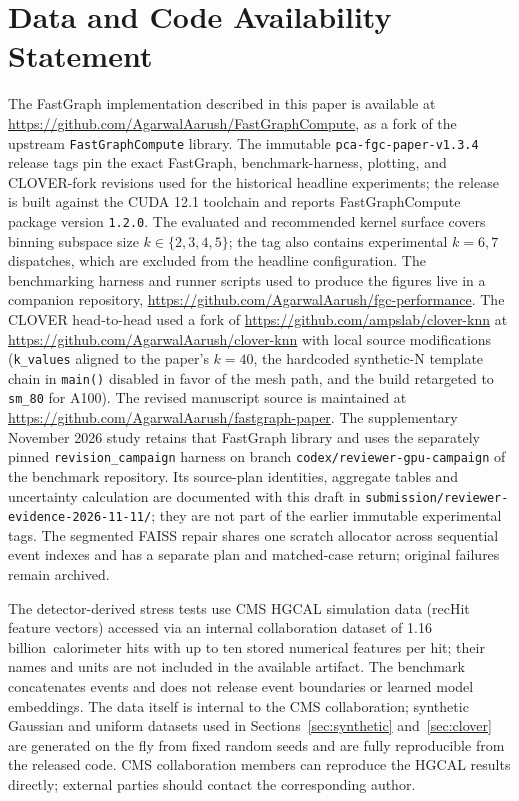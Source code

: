 \documentclass[final,3p,11pt]{elsarticle}
\newcommand{\hgcalRecHits}{1.16\,billion}
\begin{document}
\section{Data and Code Availability Statement}
\begingroup
\sloppy
The FastGraph implementation described in this paper is available at
\url{https://github.com/AgarwalAarush/FastGraphCompute}, as a fork of
the upstream \texttt{FastGraphCompute} library.
The immutable \texttt{pca-fgc-paper-v1.3.4} release tags pin the exact
FastGraph, benchmark-harness, plotting, and CLOVER-fork revisions used
for the historical headline experiments; the release is built against the CUDA
12.1 toolchain and reports FastGraphCompute package version \texttt{1.2.0}.
The evaluated and recommended kernel surface covers binning subspace size
$k \in \{2, 3, 4, 5\}$; the tag also contains experimental $k=6,7$
dispatches, which are excluded from the headline configuration. The benchmarking harness and runner scripts
used to produce the figures live in a companion repository,
\url{https://github.com/AgarwalAarush/fgc-performance}. The CLOVER
head-to-head used a fork of
\url{https://github.com/ampslab/clover-knn} at
\url{https://github.com/AgarwalAarush/clover-knn} with local source
modifications (\texttt{k\_values} aligned to the paper's $k{=}40$, the
hardcoded synthetic-N template chain in \texttt{main()} disabled in favor
of the mesh path, and the build retargeted to \texttt{sm\_80} for A100).
The revised manuscript source is maintained at
\url{https://github.com/AgarwalAarush/fastgraph-paper}.
The supplementary November 2026 study retains that FastGraph library and
uses the separately pinned \texttt{revision\_campaign} harness on branch
\texttt{codex/reviewer-gpu-campaign} of the benchmark repository.
Its source-plan identities, aggregate tables and uncertainty calculation
are documented with this draft in
\texttt{submission/reviewer-evidence-2026-11-11/}; they are not part of
the earlier immutable experimental tags. The segmented FAISS repair
shares one scratch allocator across sequential event indexes and has a
separate plan and matched-case return; original failures remain archived.
\endgroup

The detector-derived stress tests use CMS HGCAL simulation data (recHit
feature vectors) accessed via an internal collaboration dataset of
\hgcalRecHits\ calorimeter hits with up to ten stored numerical
features per hit; their names and units are not included in the available
artifact. The benchmark concatenates events and does not release
event boundaries or learned model embeddings. The data itself is internal
to the CMS collaboration;
synthetic Gaussian and uniform datasets used in
Sections~\ref{sec:synthetic} and~\ref{sec:clover} are generated on the
fly from fixed random seeds and are fully reproducible from the released
code. CMS collaboration members can reproduce the HGCAL results
directly; external parties should contact the corresponding author.
\end{document}
